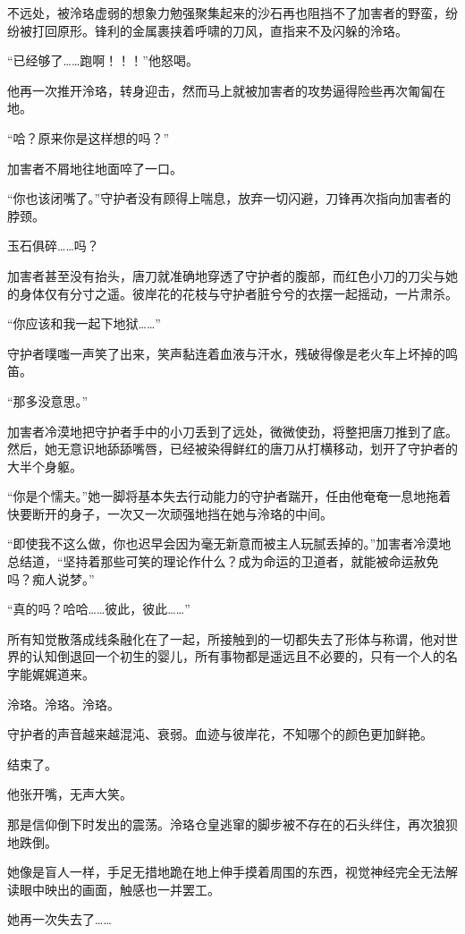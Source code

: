 \documentclass[UTF8, scheme = chinese, openany]{ctexbook}
\begin{document}
不远处，被泠珞虚弱的想象力勉强聚集起来的沙石再也阻挡不了加害者的野蛮，纷纷被打回原形。锋利的金属裹挟着呼啸的刀风，直指来不及闪躲的泠珞。

“已经够了……跑啊！！！”他怒喝。

他再一次推开泠珞，转身迎击，然而马上就被加害者的攻势逼得险些再次匍匐在地。

“哈？原来你是这样想的吗？”

加害者不屑地往地面啐了一口。

“你也该闭嘴了。”守护者没有顾得上喘息，放弃一切闪避，刀锋再次指向加害者的脖颈。

玉石俱碎……吗？

加害者甚至没有抬头，唐刀就准确地穿透了守护者的腹部，而红色小刀的刀尖与她的身体仅有分寸之遥。彼岸花的花枝与守护者脏兮兮的衣摆一起摇动，一片肃杀。

“你应该和我一起下地狱……”

守护者噗嗤一声笑了出来，笑声黏连着血液与汗水，残破得像是老火车上坏掉的鸣笛。

“那多没意思。”

加害者冷漠地把守护者手中的小刀丢到了远处，微微使劲，将整把唐刀推到了底。然后，她无意识地舔舔嘴唇，已经被染得鲜红的唐刀从打横移动，划开了守护者的大半个身躯。

“你是个懦夫。”她一脚将基本失去行动能力的守护者踹开，任由他奄奄一息地拖着快要断开的身子，一次又一次顽强地挡在她与泠珞的中间。

“即使我不这么做，你也迟早会因为毫无新意而被主人玩腻丢掉的。”加害者冷漠地总结道，“坚持着那些可笑的理论作什么？成为命运的卫道者，就能被命运赦免吗？痴人说梦。”

“真的吗？哈哈……彼此，彼此……”

所有知觉散落成线条融化在了一起，所接触到的一切都失去了形体与称谓，他对世界的认知倒退回一个初生的婴儿，所有事物都是遥远且不必要的，只有一个人的名字能娓娓道来。

泠珞。泠珞。泠珞。

守护者的声音越来越混沌、衰弱。血迹与彼岸花，不知哪个的颜色更加鲜艳。

结束了。

他张开嘴，无声大笑。

\vspace{1.5em}

那是信仰倒下时发出的震荡。泠珞仓皇逃窜的脚步被不存在的石头绊住，再次狼狈地跌倒。

她像是盲人一样，手足无措地跪在地上伸手摸着周围的东西，视觉神经完全无法解读眼中映出的画面，触感也一并罢工。

她再一次失去了……
\end{document}
